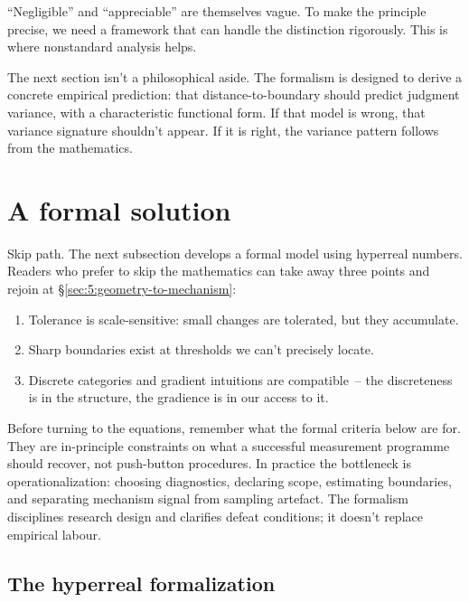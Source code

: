 \enquote{Negligible} and \enquote{appreciable} are themselves vague. To make the principle precise, we need a framework that can handle the distinction rigorously. This is where nonstandard analysis helps.

The next section isn't a philosophical aside. The formalism is designed to derive a concrete empirical prediction: that distance-to-boundary should predict judgment variance, with a characteristic functional form. If that model is wrong, that variance signature shouldn't appear. If it is right, the variance pattern follows from the mathematics.

\section{A formal solution}
\label{sec:5:formal-solution}

\begin{framed}
\noindent Skip path. The next subsection develops a formal model using hyperreal numbers. Readers who prefer to skip the mathematics can take away three points and rejoin at §\ref{sec:5:geometry-to-mechanism}:
\begin{enumerate}
    \item Tolerance is scale-sensitive: small changes are tolerated, but they accumulate.
    \item Sharp boundaries exist at thresholds we can't precisely locate.
    \item Discrete categories and gradient intuitions are compatible~-- the discreteness is in the structure, the gradience is in our access to it.
\end{enumerate}
\end{framed}

Before turning to the equations, remember what the formal criteria below are for. They are in-principle constraints on what a successful measurement programme should recover, not push-button procedures. In practice the bottleneck is operationalization: choosing diagnostics, declaring scope, estimating boundaries, and separating mechanism signal from sampling artefact. The formalism disciplines research design and clarifies defeat conditions; it doesn't replace empirical labour.

\subsection{The hyperreal formalization}
\label{subsec:5:hyperreal}


